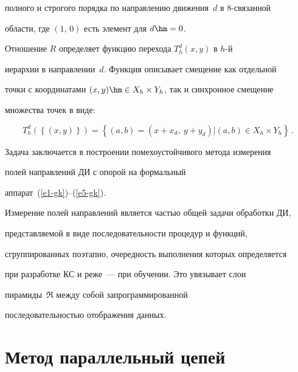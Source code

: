 полного и строгого порядка по направлению движения~$d$ в 8-свя\-зан\-ной 


области, где $(1,\,0)$ есть элемент для $d\hm=0$.


  


  Отношение $R$ определяет функцию перехода $T_h^d(x,y)$ в $h$-й 


иерархии в направлении~$d$. Функция описывает смещение как отдельной 


точки с координатами $(x,y)\hm\in X_h\times Y_h$, так и синхронное смещение 


множества точек в виде:


  \begin{equation}


  T_h^d\left( \left\{ (x,y)\right\}\right) =\left\{ (a,b)=(x+x_d,\ y+y_d)\vert (a,b)\in 


X_h\times Y_h\right\}\,.


  \label{e5-gk}


  \end{equation}


  


  Задача заключается в построении помехоустойчивого метода измерения 


полей направлений ДИ с опорой на формальный 


  аппарат~(\ref{e1-gk})--(\ref{e5-gk}).


  


  Измерение полей направлений является частью общей задачи обработки ДИ, 


представляемой в виде последовательности процедур и функций, 


сгруппированных поэтапно, очередность выполнения которых определяется 


при разработке КС и реже~--- при обучении. Это увязывает слои 


пирамиды~$\mathfrak{R}$ между собой запрограммированной 


последовательностью отображения данных.


  


\section{Метод параллельный цепей}





